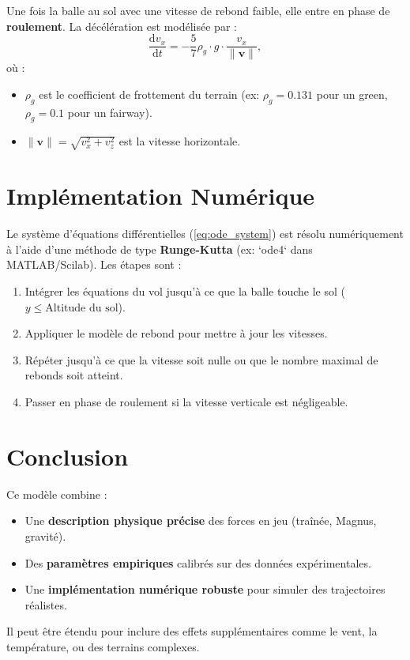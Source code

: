\documentclass[11pt, a4paper]{article}
\newcommand{\vb}[1]{\mathbf{#1}}       %
\newcommand{\dd}{\mathrm{d}}             %
\begin{document}
Une fois la balle au sol avec une vitesse de rebond faible, elle entre en phase de \textbf{roulement}. La décélération est modélisée par :
\begin{equation}
    \frac{\dd v_x}{\dd t} = -\frac{5}{7} \rho_g \cdot g \cdot \frac{v_x}{\|\vb{v}\|},
\end{equation}
où :
\begin{itemize}
    \item $\rho_g$ est le coefficient de frottement du terrain (ex: $\rho_g = 0.131$ pour un green, $\rho_g = 0.1$ pour un fairway).
    \item $\|\vb{v}\| = \sqrt{v_x^2 + v_z^2}$ est la vitesse horizontale.
\end{itemize}


\section{Implémentation Numérique}
\label{sec:numerical}

Le système d'équations différentielles (\ref{eq:ode_system}) est résolu numériquement à l'aide d'une méthode de type \textbf{Runge-Kutta} 
(ex: `ode4` dans MATLAB/Scilab). Les étapes sont :
\begin{enumerate}
    \item Intégrer les équations du vol jusqu'à ce que la balle touche le sol ($y \leq \text{Altitude du sol}$).
    \item Appliquer le modèle de rebond pour mettre à jour les vitesses.
    \item Répéter jusqu'à ce que la vitesse soit nulle ou que le nombre maximal de rebonds soit atteint.
    \item Passer en phase de roulement si la vitesse verticale est négligeable.
\end{enumerate}


\section{Conclusion}
Ce modèle combine :
\begin{itemize}
    \item Une \textbf{description physique précise} des forces en jeu (traînée, Magnus, gravité).
    \item Des \textbf{paramètres empiriques} calibrés sur des données expérimentales.
    \item Une \textbf{implémentation numérique robuste} pour simuler des trajectoires réalistes.
\end{itemize}
Il peut être étendu pour inclure des effets supplémentaires comme le vent, la température, ou des terrains complexes.



\end{document}
